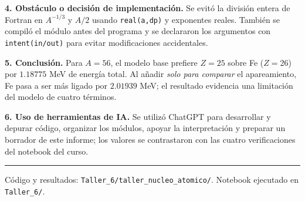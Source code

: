 \documentclass[11pt]{article}
\begin{document}
\textbf{4. Obstáculo o decisión de implementación.} Se evitó la división entera de Fortran en $A^{-1/3}$ y $A/2$ usando \texttt{real(a,dp)} y exponentes reales. También se compiló el módulo antes del programa y se declararon los argumentos con \texttt{intent(in/out)} para evitar modificaciones accidentales.

\textbf{5. Conclusión.} Para $A=56$, el modelo base prefiere $Z=25$ sobre Fe ($Z=26$) por $1.18775$ MeV de energía total. Al añadir \emph{solo para comparar} el apareamiento, Fe pasa a ser más ligado por $2.01939$ MeV; el resultado evidencia una limitación del modelo de cuatro términos.

\textbf{6. Uso de herramientas de IA.} Se utilizó ChatGPT para desarrollar y depurar código, organizar los módulos, apoyar la interpretación y preparar un borrador de este informe; los valores se contrastaron con las cuatro verificaciones del notebook del curso.

\vspace{2pt}\hrule\vspace{3pt}
{\footnotesize Código y resultados: \texttt{Taller\_6/taller\_nucleo\_atomico/}. Notebook ejecutado en \texttt{Taller\_6/}.}
\end{document}
